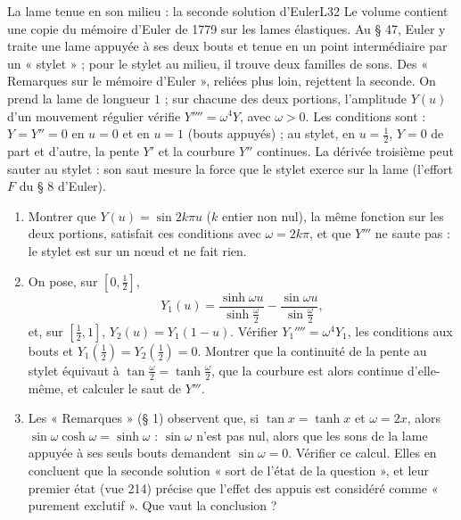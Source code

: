\documentclass[11pt,a4paper]{article}
\begin{document}
\begin{exercice}{La lame tenue en son milieu : la seconde solution d'Euler}{L3}{2}
Le volume contient une copie du mémoire d'Euler de 1779 sur les lames élastiques.
Au § 47, Euler y traite une lame appuyée à ses deux bouts et tenue en un point
intermédiaire par un « stylet » ; pour le stylet au milieu, il trouve deux familles
de sons. Des « Remarques sur le mémoire d'Euler », reliées plus loin, rejettent la
seconde. On prend la lame de longueur $1$ ; sur chacune des deux portions,
l'amplitude $Y(u)$ d'un mouvement régulier vérifie $Y'''' = \omega^4Y$, avec
$\omega > 0$. Les conditions sont : $Y = Y'' = 0$ en $u = 0$ et en $u = 1$ (bouts
appuyés) ; au stylet, en $u = \frac12$, $Y = 0$ de part et d'autre, la pente $Y'$ et
la courbure $Y''$ continues. La dérivée troisième peut sauter au stylet : son saut
mesure la force que le stylet exerce sur la lame (l'effort $F$ du § 8 d'Euler).
\begin{enumerate}
\item Montrer que $Y(u) = \sin 2k\pi u$ ($k$ entier non nul), la même fonction sur les
  deux portions, satisfait ces conditions avec $\omega = 2k\pi$, et que $Y'''$ ne saute
  pas : le stylet est sur un nœud et ne fait rien.
\item On pose, sur $[0, \frac12]$,
  \[
  Y_1(u) = \frac{\sinh\omega u}{\sinh\frac\omega2} - \frac{\sin\omega u}{\sin\frac\omega2},
  \]
  et, sur $[\frac12, 1]$, $Y_2(u) = Y_1(1-u)$. Vérifier $Y_1'''' = \omega^4Y_1$, les
  conditions aux bouts et $Y_1(\frac12) = Y_2(\frac12) = 0$. Montrer que la continuité
  de la pente au stylet équivaut à $\tan\frac\omega2 = \tanh\frac\omega2$, que la
  courbure est alors continue d'elle-même, et calculer le saut de $Y'''$.
\item Les « Remarques » (§ 1) observent que, si $\tan x = \tanh x$ et $\omega = 2x$,
  alors $\sin\omega\cosh\omega = \sinh\omega$ : $\sin\omega$ n'est pas nul, alors
  que les sons de la lame appuyée à ses seuls bouts demandent $\sin\omega = 0$.
  Vérifier ce calcul. Elles en concluent que la seconde solution « sort de l'état de
  la question », et leur premier état (vue 214) précise que l'effet des appuis est
  considéré comme « purement exclutif ». Que vaut la conclusion ?
\end{enumerate}
\end{exercice}
\end{document}
